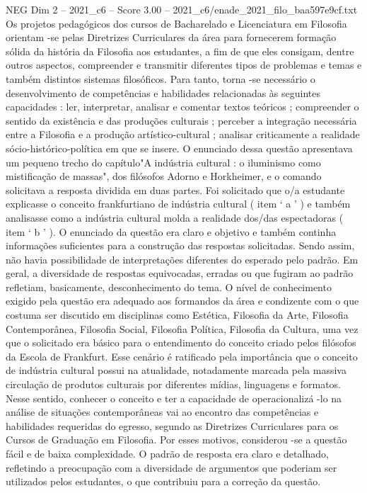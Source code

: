 \begin{textsample}{NEG Dim 2 – 2021\_c6 – Score 3.00 – 2021\_c6/enade\_2021\_filo\_baa597e9cf.txt}
Os projetos pedagógicos dos cursos de Bacharelado e Licenciatura em Filosofia orientam -se pelas Diretrizes Curriculares da área para fornecerem formação sólida da história da Filosofia aos estudantes, a fim de que eles consigam, dentre outros aspectos, compreender e transmitir diferentes tipos de problemas e temas e também distintos sistemas filosóficos.
Para tanto, torna -se necessário o desenvolvimento de competências e habilidades relacionadas às seguintes capacidades : ler, interpretar, analisar e comentar textos teóricos ; compreender o sentido da existência e das produções culturais ; perceber a integração necessária entre a Filosofia e a produção artístico-cultural ; analisar criticamente a realidade sócio-histórico-política em que se insere.
O enunciado dessa questão apresentava um pequeno trecho do capítulo"A indústria cultural : o iluminismo como mistificação de massas", dos filósofos Adorno e Horkheimer, e o comando solicitava a resposta dividida em duas partes.
Foi solicitado que o/a estudante explicasse o conceito frankfurtiano de indústria cultural ( item ‘ a ’ ) e também analisasse como a indústria cultural molda a realidade dos/das espectadoras ( item ‘ b ’ ).
O enunciado da questão era claro e objetivo e também continha informações suficientes para a construção das respostas solicitadas.
Sendo assim, não havia possibilidade de interpretações diferentes do esperado pelo padrão.
Em geral, a diversidade de respostas equivocadas, erradas ou que fugiram ao padrão refletiam, basicamente, desconhecimento do tema.
O nível de conhecimento exigido pela questão era adequado aos formandos da área e condizente com o que costuma ser discutido em disciplinas como Estética, Filosofia da Arte, Filosofia Contemporânea, Filosofia Social, Filosofia Política, Filosofia da Cultura, uma vez que o solicitado era básico para o entendimento do conceito criado pelos filósofos da Escola de Frankfurt.
Esse cenário é ratificado pela importância que o conceito de indústria cultural possui na atualidade, notadamente marcada pela massiva circulação de produtos culturais por diferentes mídias, linguagens e formatos.
Nesse sentido, conhecer o conceito e ter a capacidade de operacionalizá -lo na análise de situações contemporâneas vai ao encontro das competências e habilidades requeridas do egresso, segundo as Diretrizes Curriculares para os Cursos de Graduação em Filosofia.
Por esses motivos, considerou -se a questão fácil e de baixa complexidade.
O padrão de resposta era claro e detalhado, refletindo a preocupação com a diversidade de argumentos que poderiam ser utilizados pelos estudantes, o que contribuiu para a correção da questão.

\end{textsample}
